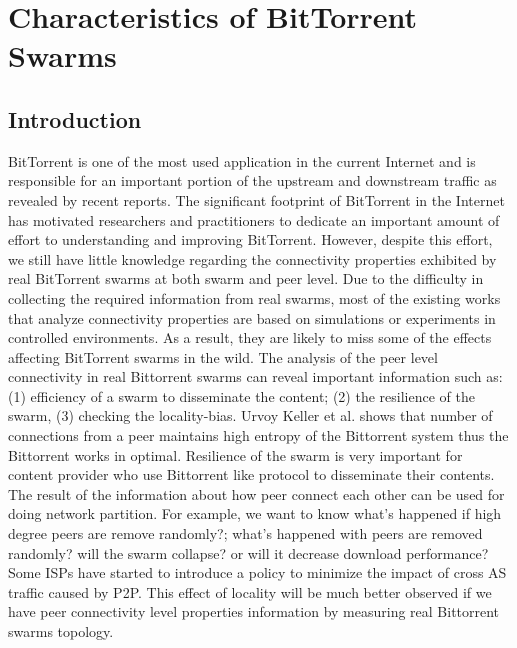 \chapter{Characteristics of BitTorrent Swarms}
\section{Introduction}
BitTorrent is one of the most used application in the current Internet and is responsible for an important portion of the upstream and downstream traffic as revealed by recent reports. 
The significant footprint of BitTorrent in the Internet has motivated researchers and practitioners to dedicate an important amount of effort to understanding and improving BitTorrent. 
However, despite this effort, we still have little knowledge regarding the connectivity properties exhibited by real BitTorrent swarms at both swarm and peer level. 
Due to the difficulty in collecting the required information from real swarms, most of the existing works that analyze connectivity properties are based on simulations or experiments in controlled environments. 
As a result, they are likely to miss some of the effects affecting BitTorrent swarms in the wild. 
The analysis of the peer level connectivity in real Bittorrent swarms can reveal important information such as: (1) efficiency of a swarm to disseminate the content; (2) the resilience of the swarm, (3) checking the locality-bias.   
Urvoy Keller et al.\cite{urvoy2007impact} shows that number of connections from a peer maintains high entropy of the Bittorrent system thus the Bittorrent works in optimal.
Resilience of the swarm is very important for content provider who use Bittorrent like protocol to disseminate their contents. 
The result of the information about how peer connect each other can be used for doing network partition.  
For example, we want to know what's happened if high degree peers are remove randomly?; what's happened with peers are removed randomly? will the swarm collapse? or will it decrease download performance?
Some ISPs have started to introduce a policy to minimize the impact of cross AS traffic caused by P2P. 
This effect of locality will be much better observed if we have peer connectivity level properties information by measuring real Bittorrent swarms topology.

